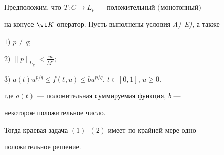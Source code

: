 \begin{thmnonum} 


Предположим, что $T:C\to L_p$ --- положительный $($монотонный$)$ 


на конусе $\wt K$ оператор. Пусть выполнены условия {\em A)--E)}, а также 


 


$1)$ $p\ne q;$ 


 


$2)$ $\|p\|_{L_q}<\frac{m}{M^2};$ 


 


$3)$ $a(t)u^{p/q}\le f(t,u)\le bu^{p/q}$, $t\in[0,1]$, $u\ge0$, 


 


\noindent{}где $a(t)$ --- положительная суммируемая функция, $b$ --- 


некоторое положительное число. 


 


Тогда краевая задача $(1)$--$(2)$ имеет по крайней мере одно 


положительное решение. 


\end{thmnonum} 


 


